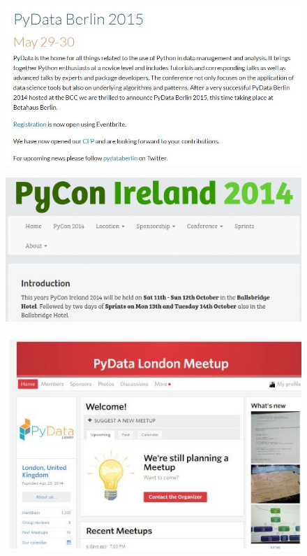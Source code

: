 \documentclass[MASTER.tex]{subfiles}
\begin{document}
	\begin{frame}
		\begin{figure}

\centering
\includegraphics[width=1.10\linewidth]{pydataberlinsiteinfo}

\end{figure}
\end{frame}
\begin{frame}
	
\begin{figure}
\centering
\includegraphics[width=1.1\linewidth]{pyconsiteinfo}

\end{figure}
\end{frame}
\begin{frame}
\begin{figure}
\centering
\includegraphics[width=1.1\linewidth]{pydatalondon}
\end{figure}
\end{frame}
\end{document}
